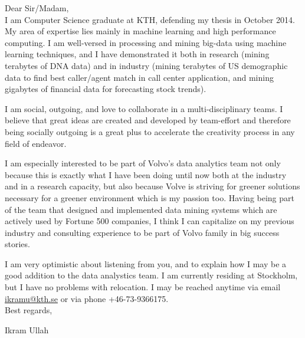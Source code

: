 \documentclass[margin, 10pt] {report}
\begin{document}
\noindent
Dear Sir/Madam, \\

\noindent
I am Computer Science graduate at KTH, defending my thesis in October 2014. My area of expertise lies mainly in machine learning and high performance computing. I am well-versed in processing and mining big-data using machine learning techniques, and I have demonstrated it both in research (mining terabytes of DNA data) and in industry (mining terabytes of US demographic data to find best caller/agent match in call center application, and  mining gigabytes of financial data for forecasting stock trends).

\noindent
I am social, outgoing, and love to collaborate in a multi-disciplinary teams. I believe that great ideas are created and developed by team-effort and therefore being socially outgoing is a great plus to accelerate the creativity process in any field of endeavor.

\noindent
I am especially interested to be part of Volvo's data analytics team not only because this is exactly what I have been doing until now both at the industry and in a research capacity, but also because Volve is striving for greener solutions necessary for a greener environment which is my passion too. Having being part of the team that designed and implemented data mining systems which are actively used by Fortune 500 companies, I think I can capitalize on my previous industry and consulting experience to be part of Volvo family in big success stories.

\noindent
I am very optimistic about listening from you, and to explain how I may be a good addition to the data analystics team. I am currently residing at Stockholm, but I have no problems with relocation. I may be reached anytime via email \url{ikramu@kth.se} or via phone +46-73-9366175. \\

\noindent
Best regards, 

\noindent
Ikram Ullah
\end{document}
